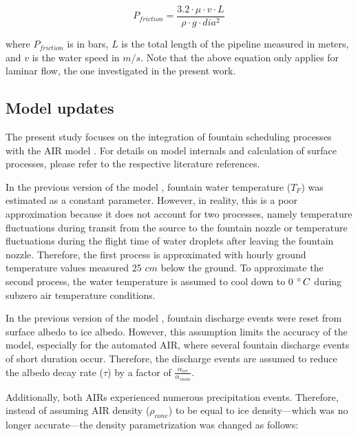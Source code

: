 \documentclass[tc, manuscript]{copernicus}
\begin{document}
\begin{equation}
  \label{eqn:friction}
  P_{friction} = \frac{3.2 \cdot \mu \cdot v \cdot L}{\rho \cdot g \cdot dia^2}
\end{equation}

where $P_{friction}$ is in bars, $L$ is the total length of the pipeline measured in meters, and $v$ is the water speed in
$m/s$. Note that the above equation only applies for laminar flow, the one investigated in the present work.

\subsection{Model updates}

The present study focuses on the integration of fountain scheduling processes with the AIR model
\citep{balasubramanianInfluenceMeteorologicalConditions2022}. For details on model internals and calculation of
surface processes, please refer to the respective literature references. 

In the previous version of the model \citep{balasubramanianInfluenceMeteorologicalConditions2022}, fountain
water temperature ($T_F$) was estimated as a constant parameter. However, in reality, this is a poor
approximation because it does not account for two processes, namely temperature fluctuations during transit from
the source to the fountain nozzle or temperature fluctuations during the flight time of water droplets after
leaving the fountain nozzle. Therefore, the first process is approximated with hourly ground temperature values
measured 25 $cm$ below the ground. To approximate the second process, the water temperature is assumed to cool
down to 0 $^{\circ}\,C$ during subzero air temperature conditions.

In the previous version of the model \citep{balasubramanianInfluenceMeteorologicalConditions2022}, fountain
discharge events were reset from surface albedo to ice albedo. However, this assumption limits the accuracy of
the model, especially for the automated AIR, where several fountain discharge events of short duration occur.
Therefore, the discharge events are assumed to reduce the albedo decay rate ($\tau$) by a factor of
$\frac{\alpha_{ice}}{\alpha_{snow}}$.

Additionally, both AIRs experienced numerous precipitation events. Therefore, instead of assuming AIR density
($\rho_{cone}$) to be equal to ice density---which was no longer accurate---the density
parametrization was changed as follows:
\end{document}
